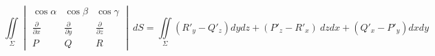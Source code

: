 \begin{comm}
    \[\iint\limits_{\Sigma} \begin{vmatrix}
        \cos{\alpha} & \cos{\beta} & \cos{\gamma}\\
        \frac{\partial}{\partial x} & \frac{\partial}{\partial y} & \frac{\partial}{\partial z}\\
        P & Q & R
    \end{vmatrix}\ dS=\iint\limits_{\Sigma}(R'_y-Q'_z)dydz+(P'_z-R'_x)\ dzdx+(Q'_x-P'_y)dxdy\]
\end{comm}
\newpage